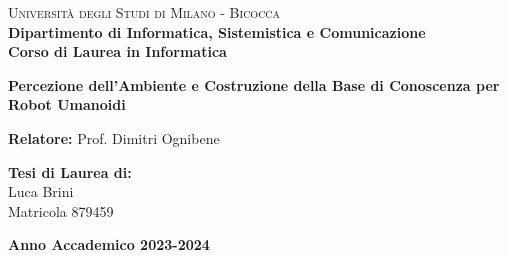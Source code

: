 


\begin{titlepage}

    \noindent
    \begin{minipage}[t]{0.19\textwidth}
    \end{minipage}
    \hspace{2mm}
    \begin{minipage}[t]{0.70\textwidth}
        {
            {\textsc{Università degli Studi di Milano - Bicocca}} \\
            \textbf{Dipartimento di Informatica, Sistemistica e Comunicazione} \\
            \textbf{Corso di Laurea in Informatica} \\
            \par
        }
    \end{minipage}

    \vspace{40mm}

    \begin{center}
        {\LARGE{
                \textbf{Percezione dell'Ambiente e Costruzione della Base di Conoscenza per Robot Umanoidi}
                \par
            }}
    \end{center}

    \vspace{50mm}

    \noindent
    {\large \textbf{Relatore:} Prof. Dimitri Ognibene } \\

    \vspace{15mm}

    \begin{flushright}
        {\large \textbf{Tesi di Laurea di:}} \\
        \large{Luca Brini} \\
        \large{Matricola 879459}
    \end{flushright}

    \vspace{20mm}
    \begin{center}
        {\large{\bf Anno Accademico 2023-2024}}
    \end{center}


\end{titlepage}
